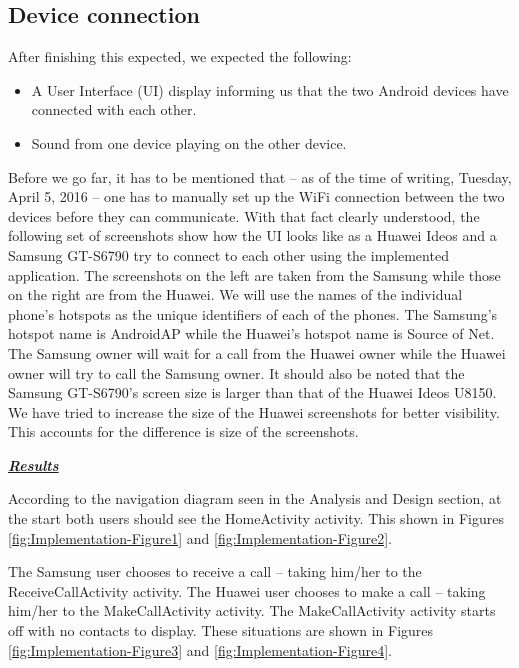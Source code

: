 \documentclass[12pt,svgnames,smaller]{article} %
\begin{document}
	\subsection{Device connection}
	
	
	After finishing this expected, we expected the following:
	
	\begin{itemize}
		\item A User Interface (UI) display informing us that the two Android devices have connected with each other.
		\item Sound from one device playing on the other device.
	\end{itemize}
	
	Before we go far, it has to be mentioned that – as of the time of writing, Tuesday, April 5, 2016 – one has to manually set up the WiFi connection between the two devices before they can communicate. With that fact clearly understood, the following set of screenshots show how the UI looks like as a Huawei Ideos and a Samsung GT-S6790 try to connect to each other using the implemented application.  The screenshots on the left are taken from the Samsung while those on the right are from the Huawei. We will use the names of the individual phone’s hotspots as the unique identifiers of each of the phones. The Samsung’s hotspot name is AndroidAP while the Huawei’s hotspot name is Source of Net. The Samsung owner will wait for a call from the Huawei owner while the Huawei owner will try to call the Samsung owner. It should also be noted that the Samsung GT-S6790’s screen size is larger than that of the Huawei Ideos U8150. We have tried to increase the size of the Huawei screenshots for better visibility. This accounts for the difference is size of the screenshots.
		
	
	\textbf{\textit{\underline{Results}}}
	
		According to the navigation diagram seen in the Analysis and Design section, at the start both users should see the HomeActivity activity. This shown in Figures \ref{fig:Implementation-Figure1} and \ref{fig:Implementation-Figure2}.
		
		The Samsung user chooses to receive a call – taking him/her to the ReceiveCallActivity activity. The Huawei user chooses to make a call – taking him/her to the MakeCallActivity activity. The MakeCallActivity activity starts off with no contacts to display. These situations are shown in Figures \ref{fig:Implementation-Figure3} and \ref{fig:Implementation-Figure4}.
		
\end{document}

